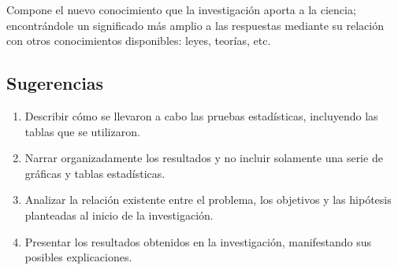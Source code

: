 Compone el nuevo conocimiento que la investigación aporta a la ciencia; encontrándole un significado más amplio a las respuestas mediante su relación con otros conocimientos disponibles: leyes, teorías, etc.

\subsection{Sugerencias}

\begin{enumerate}[noitemsep]
 \item Describir cómo se llevaron a cabo las pruebas estadísticas, incluyendo las tablas que se utilizaron.
 \item Narrar organizadamente los resultados y no incluir solamente una serie de gráficas y tablas estadísticas.
 \item Analizar la relación existente entre el problema, los objetivos y las hipótesis planteadas al inicio de la investigación.
 \item Presentar los resultados obtenidos en la investigación, manifestando sus posibles explicaciones.
\end{enumerate}
